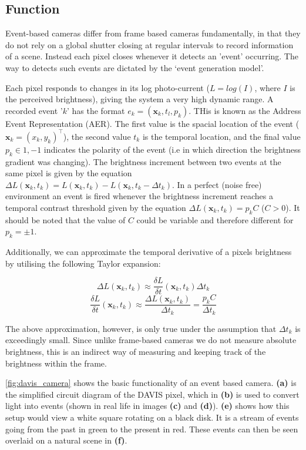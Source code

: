\subsection{Function}
Event-based cameras differ from frame based cameras fundamentally, in that they do not rely on a global shutter closing at regular intervals to record information of a scene. Instead each pixel closes whenever it detects an 'event' occurring. The way to detects such events are dictated by the `event generation model'\cite{EventBasedVisionASurvery}.

Each pixel responds to changes in its log photo-current ($ L = log(I) $, where $I$ is the perceived brightness), giving the system a very high dynamic range. A recorded event '$ k $' has the format $ e_k = (\boldsymbol{\mathbf{x}}_k, t_l, p_k ) $. THis is known as the Address Event Representation (AER). The first value is the spacial location of the event ($ \boldsymbol{\mathbf{x}}_k = (x_k, y_k)^\top $), the second value $ t_k $ is the temporal location, and the final value $ p_k \in {1, -1} $ indicates the polarity of the event (i.e in which direction the brightness gradient was changing). The brightness increment between two events at the same pixel is given by the equation $ \Delta L(\boldsymbol{\mathbf{x}}_k, t_k) = L(\boldsymbol{\mathbf{x}}_k, t_k) - L(\boldsymbol{\mathbf{x}}_k, t_k - \Delta t_k) $. In a perfect (noise free) environment an event is fired whenever the brightness increment reaches a temporal contrast threshold given by the equation $ \Delta L(\boldsymbol{\mathbf{x}}_k, t_k) = p_k C $ ($ C > 0 $). It should be noted that the value of $ C $ could be variable and therefore different for $ p_k = \pm 1 $.

Additionally, we can approximate the temporal derivative of a pixels brightness by utilising the following Taylor expansion:

$$ \Delta L(\boldsymbol{\mathbf{x}}_k, t_k) \approx \frac{\delta L}{\delta t}(\boldsymbol{\mathbf{x}}_k, t_k)\Delta t_k $$
$$ \frac{\delta L}{\delta t}(\boldsymbol{\mathbf{x}}_k, t_k) \approx \frac{\Delta L(\boldsymbol{\mathbf{x}}_k, t_k)}{\Delta t_k} = \frac{p_k C}{\Delta t_k} $$

The above approximation, however, is only true under the assumption that $ \Delta t_k $ is exceedingly small. Since unlike frame-based cameras we do not measure absolute brightness, this is an indirect way of measuring and keeping track of the brightness within the frame.

\autoref{fig:davis_camera} shows the basic functionality of an event based camera. \textbf{(a)} is the simplified circuit diagram of the DAVIS pixel, which in \textbf{(b)} is used to convert light into events (shown in real life in images \textbf{(c)} and \textbf{(d)}). \textbf{(e)} shows how this setup would view a white square rotating on a black disk. It is a stream of events going from the past in green to the present in red. These events can then be seen overlaid on a natural scene in \textbf{(f)}.

